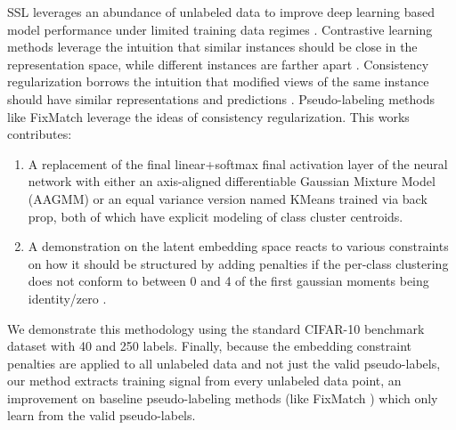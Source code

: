 \documentclass[10pt,twocolumn,letterpaper]{article}
\begin{document}
SSL leverages an abundance of unlabeled data to improve deep learning based model performance under limited training data regimes \cite{zhu2022introduction,li2019safe,hady2013semi}.
Contrastive learning methods leverage the intuition that similar instances should be close in the representation space, while different instances are farther apart \cite{yang2022class,li2021comatch}.
Consistency regularization borrows the intuition that modified views of the same instance should have similar representations and predictions \cite{sohn2020fixmatch,lee2022contrastive,zhang2021flexmatch,kim2022conmatch}.
Pseudo-labeling methods like FixMatch \cite{sohn2020fixmatch} leverage the ideas of consistency regularization.
This works contributes:

\begin{enumerate}
	\item A replacement of the final linear+softmax final activation layer of the neural network with either an axis-aligned differentiable Gaussian Mixture Model (AAGMM) or an equal variance version named KMeans trained via back prop, both of which have explicit modeling of class cluster centroids. 
	\item A demonstration on the latent embedding space reacts to various constraints on how it should be structured by adding penalties if the per-class clustering does not conform to between 0 and 4 of the first gaussian moments being identity/zero \cite{pearson1936method}.
\end{enumerate}

We demonstrate this methodology using the standard CIFAR-10 benchmark dataset with 40 and 250 labels\cite{cifar10}. %
Finally, because the embedding constraint penalties are applied to all unlabeled data and not just the valid pseudo-labels, our method extracts training signal from every unlabeled data point, an improvement on baseline pseudo-labeling methods (like FixMatch \cite{sohn2020fixmatch}) which only learn from the valid pseudo-labels.
\end{document}
